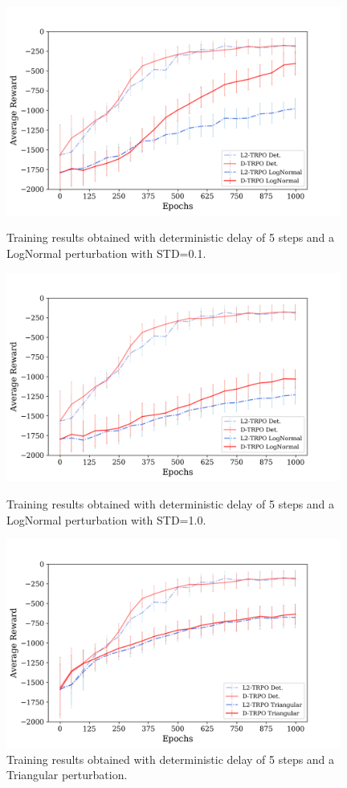             \begin{figure}[hbtp]
                \centering
                \includegraphics[width=11cm, keepaspectratio]{images/results/noises_logns_comparison_1.png}
                \caption{Training results obtained with deterministic delay of 5 steps and a LogNormal perturbation with STD=0.1.}
                \label{fig:results_logns_1}
                
                \includegraphics[width=11cm, keepaspectratio]{images/results/noises_logn_comparison_1.png}
                \caption{Training results obtained with deterministic delay of 5 steps and a LogNormal perturbation with STD=1.0.}
                \label{fig:results_logn_1}
                
                \includegraphics[width=11cm, keepaspectratio]{images/results/noises_tri_comparison_1.png}
                \caption{Training results obtained with deterministic delay of 5 steps and a Triangular perturbation.}
                \label{fig:results_tri_1}
            \end{figure}